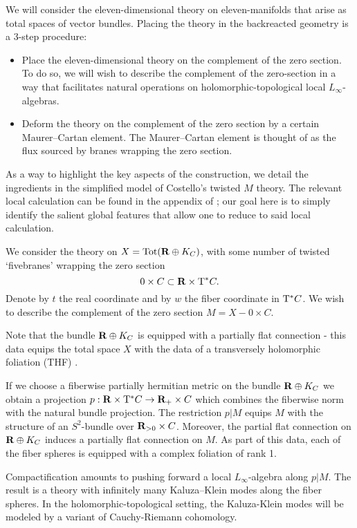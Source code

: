 We will consider the eleven-dimensional theory on eleven-manifolds that arise as total spaces of vector bundles. Placing the theory in the backreacted geometry is a 3-step procedure:

\begin{itemize}
  \item Place the eleven-dimensional theory on the complement of the zero section. To do so, we will wish to describe the complement of the zero-section in a way that facilitates natural operations on holomorphic-topological local $L_{\infty}$-algebras.

  \item Deform the theory on the complement of the zero section by a certain Maurer--Cartan element.
  The Maurer--Cartan element is thought of as the flux sourced by branes wrapping the zero section.
\end{itemize}

\parsec[s:brkevin]
As a way to highlight the key aspects of the construction, we detail the ingredients in the simplified model of Costello's twisted $M$ theory. The relevant local calculation can be found in the appendix of \cite{}; our goal here is to simply identify the salient global features that allow one to reduce to said local calculation.

We consider the theory on $X = \text{Tot} (\mathbf{R}\oplus K_{C})$, with some number of twisted `fivebranes' wrapping the zero section
\[
0 \times C \subset \mathbf{R} \times {\rm T}^* C .
\]
Denote by $t$ the real coordinate and by $w$ the fiber coordinate in ${\rm T}^* C$. We wish to describe the complement of the zero section $M = X - 0 \times C$.

Note that the bundle $\mathbf{R}\oplus K_{C}$ is equipped with a partially flat connection - this data equips the total space $X$ with the data of a transversely holomorphic foliation (THF) \cite{DuchampKalka}. 

If we choose a fiberwise partially hermitian metric on the bundle $\mathbf{R} \oplus K_C$ we obtain a projection $p: \mathbf{R} \times {\rm T}^*C \to \mathbf{R}_{+} \times C$ which combines the fiberwise norm with the natural bundle projection. The restriction $p|M$ equips $M$ with the structure of an $S^{2}$-bundle over $\mathbf{R}_{>0}\times C$. Moreover, the partial flat connection on $\mathbf{R}\oplus K_{C}$ induces a partially flat connection on $M$. As part of this data, each of the fiber spheres is equipped with a complex foliation of rank 1.

Compactification amounts to pushing forward a local $L_{\infty}$-algebra along $p|M$. The result is a theory with infinitely many Kaluza--Klein modes along the fiber spheres. In the holomorphic-topological setting, the Kaluza-Klein modes will be modeled by a variant of Cauchy-Riemann cohomology.

